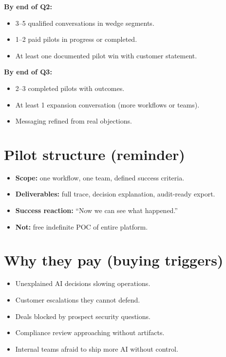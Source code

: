 \textbf{By end of Q2:}
\begin{itemize}
  \item 3--5 qualified conversations in wedge segments.
  \item 1--2 paid pilots in progress or completed.
  \item At least one documented pilot win with customer statement.
\end{itemize}

\textbf{By end of Q3:}
\begin{itemize}
  \item 2--3 completed pilots with outcomes.
  \item At least 1 expansion conversation (more workflows or teams).
  \item Messaging refined from real objections.
\end{itemize}

\section{Pilot structure (reminder)}

\begin{itemize}
  \item \textbf{Scope:} one workflow, one team, defined success criteria.
  \item \textbf{Deliverables:} full trace, decision explanation, audit-ready export.
  \item \textbf{Success reaction:} ``Now we can see what happened.''
  \item \textbf{Not:} free indefinite POC of entire platform.
\end{itemize}

\section{Why they pay (buying triggers)}

\begin{itemize}
  \item Unexplained AI decisions slowing operations.
  \item Customer escalations they cannot defend.
  \item Deals blocked by prospect security questions.
  \item Compliance review approaching without artifacts.
  \item Internal teams afraid to ship more AI without control.
\end{itemize}


